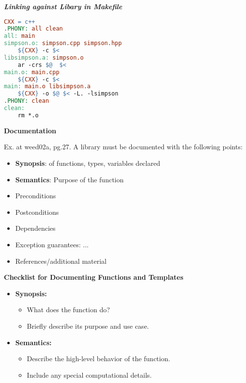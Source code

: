 \documentclass[fontsize=8pt, a4paper, landscape, fleqn]{scrartcl}
\renewcommand{\subsection}[1]{%
    \noindent\colorbox{subsectioncolor}{%
        \parbox{\dimexpr\columnwidth-2\fboxsep}{\color{white}\textbf{#1}}}%
    \vspace{0.5mm}%
}
\renewcommand{\subsubsection}[1]{%
    \noindent\textbf{\textit{\color{subsectioncolor}#1}}%
    \vspace{1mm}%
}
\begin{document}
\begin{multicols*}{3}[\raggedcolumns]
\subsubsection{Linking against Libary in Makefile}
\begin{lstlisting}[language=make, breaklines, emph={src}, emphstyle={\color{red}}]
CXX = c++
.PHONY: all clean
all: main
simpson.o: simpson.cpp simpson.hpp
    ${CXX} -c $<
libsimpson.a: simpson.o
    ar -crs $@  $<
main.o: main.cpp
    ${CXX} -c $< 
main: main.o libsimpson.a
    ${CXX} -o $@ $< -L. -lsimpson
.PHONY: clean
clean:
    rm *.o


\end{lstlisting}
    
    \subsection{Documentation}
     Ex. at weed02a, pg.27. A library must be documented with the following points:
    \begin{multicols}{2}
    \begin{itemize}
        \item \textbf{Synopsis}: of functions, types, variables declared
        \item \textbf{Semantics}: Purpose of the function
        \item Preconditions
        \item Postconditions
        \item Dependencies
        \item Exception guarantees: ...
        \item References/additional material
    \end{itemize}
    \end{multicols}
    \subsection{Checklist for Documenting Functions and Templates}

\begin{itemize}
    \item \textbf{Synopsis:} 
    \begin{itemize}
        \item What does the function do?
        \item Briefly describe its purpose and use case.
    \end{itemize}

    \item \textbf{Semantics:}
    \begin{itemize}
        \item Describe the high-level behavior of the function.
        \item Include any special computational details.
    \end{itemize}


\end{itemize}
\end{multicols*}
\end{document}
